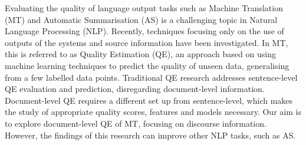 Evaluating the quality of language output tasks such as Machine Translation (MT) and Automatic Summarisation (AS) is a challenging topic in Natural Language Processing (NLP). Recently, techniques focusing only on the use of outputs of the systems and source information have been investigated. In MT, this is referred to as Quality Estimation (QE), an approach based on using machine learning techniques to predict the quality of unseen data, generalising from a few labelled data points. Traditional QE research addresses sentence-level QE evaluation and prediction, disregarding document-level information. Document-level QE requires a different set up from sentence-level, which makes the study of appropriate quality scores, features and models necessary. Our aim is to explore document-level QE of MT, focusing on discourse information. However, the findings of this research can improve other NLP tasks, such as AS.
